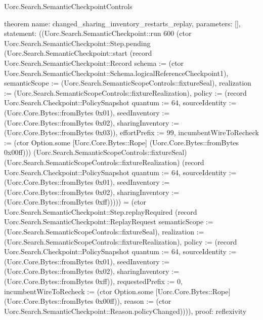 \begin{lexlean}{Uorc.Search.SemanticCheckpointControls}
\begin{semanticmodule}
theorem{
  name: changed_sharing_inventory_restarts_replay,
  parameters: [],
  statement: ((Uorc.Search.SemanticCheckpoint::run 600 (ctor Uorc.Search.SemanticCheckpoint::Step.pending (Uorc.Search.SemanticCheckpoint::start (record Uorc.Search.SemanticCheckpoint::Record {schema := (ctor Uorc.Search.SemanticCheckpoint::Schema.logicalReferenceCheckpoint1), semanticScope := (Uorc.Search.SemanticScopeControls::fixtureSeal), realization := (Uorc.Search.SemanticScopeControls::fixtureRealization), policy := (record Uorc.Search.Checkpoint::PolicySnapshot {quantum := 64, sourceIdentity := (Uorc.Core.Bytes::fromBytes 0x01), seedInventory := (Uorc.Core.Bytes::fromBytes 0x02), sharingInventory := (Uorc.Core.Bytes::fromBytes 0x03)}), effortPrefix := 99, incumbentWireToRecheck := (ctor Option.some [Uorc.Core.Bytes::Rope] (Uorc.Core.Bytes::fromBytes 0x00ff))}) (Uorc.Search.SemanticScopeControls::fixtureSeal) (Uorc.Search.SemanticScopeControls::fixtureRealization) (record Uorc.Search.Checkpoint::PolicySnapshot {quantum := 64, sourceIdentity := (Uorc.Core.Bytes::fromBytes 0x01), seedInventory := (Uorc.Core.Bytes::fromBytes 0x02), sharingInventory := (Uorc.Core.Bytes::fromBytes 0xff)})))) = (ctor Uorc.Search.SemanticCheckpoint::Step.replayRequired (record Uorc.Search.SemanticCheckpoint::ReplayRequest {semanticScope := (Uorc.Search.SemanticScopeControls::fixtureSeal), realization := (Uorc.Search.SemanticScopeControls::fixtureRealization), policy := (record Uorc.Search.Checkpoint::PolicySnapshot {quantum := 64, sourceIdentity := (Uorc.Core.Bytes::fromBytes 0x01), seedInventory := (Uorc.Core.Bytes::fromBytes 0x02), sharingInventory := (Uorc.Core.Bytes::fromBytes 0xff)}), requestedPrefix := 0, incumbentWireToRecheck := (ctor Option.some [Uorc.Core.Bytes::Rope] (Uorc.Core.Bytes::fromBytes 0x00ff)), reason := (ctor Uorc.Search.SemanticCheckpoint::Reason.policyChanged)}))),
  proof: reflexivity{}
}


\end{semanticmodule}
\end{lexlean}
